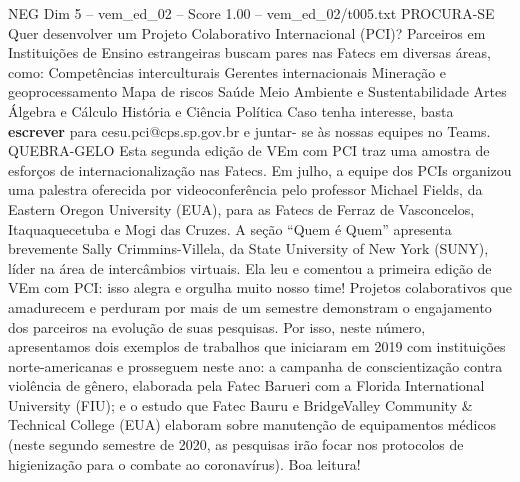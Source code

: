 \begin{textsample}{NEG Dim 5 – vem\_ed\_02 – Score 1.00 – vem\_ed\_02/t005.txt}  \label{ex:f5_neg_088}
PROCURA-SE Quer desenvolver um Projeto Colaborativo Internacional (PCI)?
Parceiros em Instituições de Ensino estrangeiras buscam pares nas Fatecs em diversas áreas, como: Competências interculturais Gerentes internacionais Mineração e geoprocessamento Mapa de riscos Saúde Meio Ambiente e Sustentabilidade Artes Álgebra e Cálculo História e Ciência Política Caso tenha interesse, basta \textbf{escrever} para cesu.pci@cps.sp.gov.br e juntar- se às nossas equipes no Teams.
QUEBRA-GELO Esta segunda edição de VEm com PCI traz uma amostra de esforços de internacionalização nas Fatecs.
Em julho, a equipe dos PCIs organizou uma palestra oferecida por videoconferência pelo professor Michael Fields, da Eastern Oregon University (EUA), para as Fatecs de Ferraz de Vasconcelos, Itaquaquecetuba e Mogi das Cruzes.
A seção “Quem é Quem” apresenta brevemente Sally Crimmins-Villela, da State University of New York (SUNY), líder na área de intercâmbios virtuais.
Ela leu e comentou a primeira edição de VEm com PCI: isso alegra e orgulha muito nosso time!
Projetos colaborativos que amadurecem e perduram por mais de um semestre demonstram o engajamento dos parceiros na evolução de suas pesquisas.
Por isso, neste número, apresentamos dois exemplos de trabalhos que iniciaram em 2019 com instituições norte-americanas e prosseguem neste ano: a campanha de conscientização contra violência de gênero, elaborada pela Fatec Barueri com a Florida International University (FIU); e o estudo que Fatec Bauru e BridgeValley Community \& Technical College (EUA) elaboram sobre manutenção de equipamentos médicos (neste segundo semestre de 2020, as pesquisas irão focar nos protocolos de higienização para o combate ao coronavírus).
Boa leitura!

\end{textsample}

